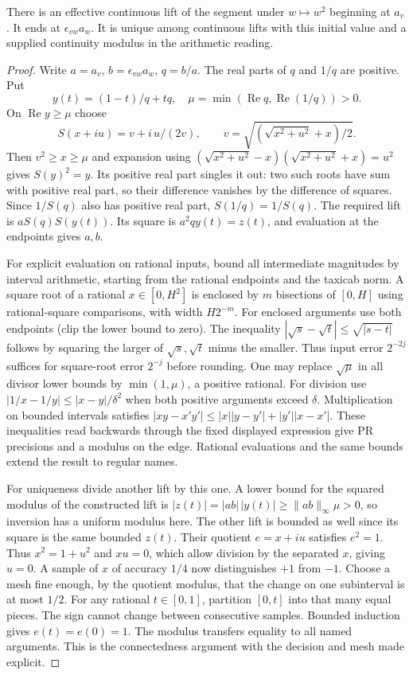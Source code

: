 \begin{lemma}\label{lem:sqrt-edge}
There is an effective continuous lift of the segment under $w\mapsto w^2$ beginning at $a_v$. It ends at $\epsilon_{vw}a_w$. It is unique among continuous lifts with this initial value and a supplied continuity modulus in the arithmetic reading.
\end{lemma}
\begin{proof}
Write $a=a_v$, $b=\epsilon_{vw}a_w$, $q=b/a$. The real parts of $q$ and $1/q$ are positive. Put
\[
  y(t)=(1-t)/q+tq,\quad
  \mu=\min(\operatorname{Re}q,\operatorname{Re}(1/q))>0.
\]
On $\operatorname{Re}y\ge\mu$ choose
\[
 S(x+iu)=v+i\,u/(2v),\qquad
 v=\sqrt{(\sqrt{x^2+u^2}+x)/2}.
\]
Then $v^2\ge x\ge\mu$ and expansion using $(\sqrt{x^2+u^2}-x)(\sqrt{x^2+u^2}+x)=u^2$ gives $S(y)^2=y$. Its positive real part singles it out: two such roots have sum with positive real part, so their difference vanishes by the difference of squares. Since $1/S(q)$ also has positive real part, $S(1/q)=1/S(q)$. The required lift is $a S(q)S(y(t))$. Its square is $a^2q y(t)=z(t)$, and evaluation at the endpoints gives $a,b$.

For explicit evaluation on rational inputs, bound all intermediate magnitudes by interval arithmetic, starting from the rational endpoints and the taxicab norm. A square root of a rational $x\in[0,H^2]$ is enclosed by $m$ bisections of $[0,H]$ using rational-square comparisons, with width $H2^{-m}$. For enclosed arguments use both endpoints (clip the lower bound to zero). The inequality $|\sqrt{s}-\sqrt{t}|\le\sqrt{|s-t|}$ follows by squaring the larger of $\sqrt{s},\sqrt{t}$ minus the smaller. Thus input error $2^{-2j}$ suffices for square-root error $2^{-j}$ before rounding. One may replace $\sqrt\mu$ in all divisor lower bounds by $\min(1,\mu)$, a positive rational. For division use $|1/x-1/y|\le |x-y|/\delta^2$ when both positive arguments exceed $\delta$. Multiplication on bounded intervals satisfies $|xy-x'y'|\le |x||y-y'|+|y'||x-x'|$. These inequalities read backwards through the fixed displayed expression give PR precisions and a modulus on the edge. Rational evaluations and the same bounds extend the result to regular names.

For uniqueness divide another lift by this one. A lower bound for the squared modulus of the constructed lift is $|z(t)|=|ab|\,|y(t)|\ge\lVert ab\rVert_\infty\mu>0$, so inversion has a uniform modulus here. The other lift is bounded as well since its square is the same bounded $z(t)$. Their quotient $e=x+iu$ satisfies $e^2=1$. Thus $x^2=1+u^2$ and $xu=0$, which allow division by the separated $x$, giving $u=0$. A sample of $x$ of accuracy $1/4$ now distinguishes $+1$ from $-1$. Choose a mesh fine enough, by the quotient modulus, that the change on one subinterval is at most $1/2$. For any rational $t\in[0,1]$, partition $[0,t]$ into that many equal pieces. The sign cannot change between consecutive samples. Bounded induction gives $e(t)=e(0)=1$. The modulus transfers equality to all named arguments. This is the connectedness argument with the decision and mesh made explicit.
\end{proof}

